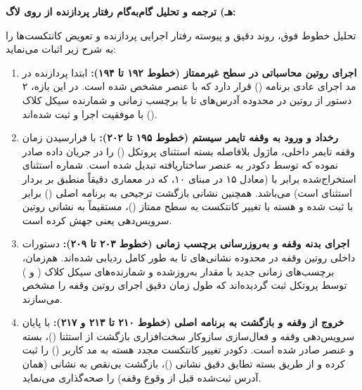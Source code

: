 \vspace{0.4cm}
\noindent
\textbf{هـ) ترجمه و تحلیل گام‌به‌گام رفتار پردازنده از روی لاگ:}\par
تحلیل خطوط فوق، روند دقیق و پیوسته رفتار اجرایی پردازنده و تعویض کانتکست‌ها را به شرح زیر اثبات می‌نماید:
\begin{enumerate}
    \item \textbf{اجرای روتین محاسباتی در سطح غیرممتاز (خطوط ۱۹۲ تا ۱۹۴):}
    ابتدا پردازنده در مد اجرای عادی برنامه () قرار دارد که با عنصر  مشخص شده است. در این بازه، ۲ دستور از روتین در محدوده آدرس‌های  تا  با برچسب زمانی  و شمارنده سیکل کلاک () با موفقیت اجرا و ثبت شده‌اند.

    \item \textbf{رخداد و ورود به وقفه تایمر سیستم  (خطوط ۱۹۵ تا ۲۰۲):}
    با فرارسیدن زمان وقفه تایمر داخلی، ماژول  بلافاصله بسته استثنای پروتکل () را در جریان داده صادر نموده که توسط دکودر به عنصر ساختاریافته  تبدیل شده است. شماره استثنای استخراج‌شده برابر با  (معادل ۱۵ در مبنای ۱۰، که در معماری  دقیقاً منطبق بر بردار استثنای  است) می‌باشد. همچنین نشانی بازگشت ترجیحی به برنامه اصلی () برابر با  ثبت شده و هسته با تغییر کانتکست به سطح ممتاز ()، مستقیماً به نشانی روتین سرویس‌دهی  یعنی  جهش کرده است.

    \item \textbf{اجرای بدنه وقفه و به‌روزرسانی برچسب زمانی (خطوط ۲۰۳ تا ۲۰۹):}
    دستورات داخلی روتین وقفه در محدوده نشانی‌های  تا  به طور کامل ردیابی شده‌اند. هم‌زمان، برچسب‌های زمانی جدید با مقدار به‌روزشده  و شمارنده‌های سیکل کلاک ( و ) توسط پروتکل ثبت گردیده‌اند که طول زمان دقیق اجرای روتین وقفه را مشخص می‌سازند.

    \item \textbf{خروج از وقفه و بازگشت به برنامه اصلی (خطوط ۲۱۰ تا ۲۱۳ و ۲۱۷):}
    با پایان سرویس‌دهی وقفه و فعال‌سازی سازوکار سخت‌افزاری بازگشت از استثنا ()، بسته  و عنصر  صادر شده است. دکودر تغییر کانتکست مجدد هسته به مد کاربر () را ثبت کرده و از طریق بسته تطابق دقیق نشانی ()، بازگشت بی‌نقص به نشانی  (همان آدرس ثبت‌شده قبل از وقوع وقفه) را صحه‌گذاری می‌نماید.


\end{enumerate}
